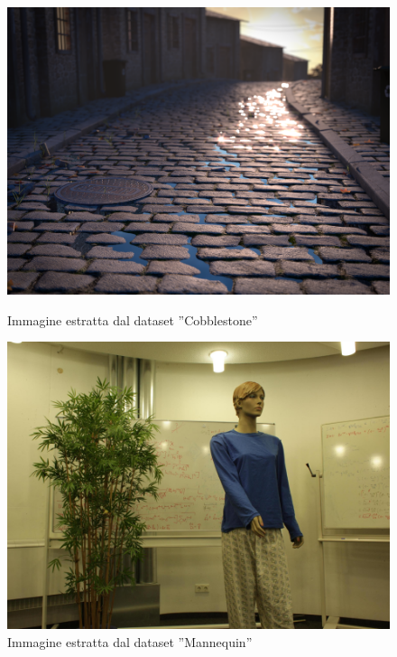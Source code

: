 \begin{figure}[ht]
    \begin{minipage}[b]{0.32\linewidth}
        \centering
        \includegraphics[width=\linewidth]{img/Cobblestone.png}
        \caption{Immagine estratta dal dataset ”Cobblestone”}
        \label{fig:Cobblestone}
    \end{minipage}
    \hfill
    \begin{minipage}[b]{0.32\linewidth}
        \centering
        \includegraphics[width=\linewidth]{img/Mannequin.png}
        \caption{Immagine estratta dal dataset ”Mannequin”}
        \label{fig:Mannequin}
    \end{minipage}
\end{figure}

